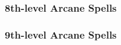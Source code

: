 \subsubsection{8th-level Arcane Spells} 
\begin{swspelllist}

    \SLspelltheftgreater*[Abjur]

    \SLimprisonment[Conj]
    \SLdimensiondoormass*
    \SLmaze*

    \SLreadmindmass[Div]
    \SLmomentofpresciencegreater*

    \SLdiscordantsong[Ench]
    \SLfeeblemind
    \SLheroismgreater
    \SLholdmonstermass
    \SLphantasmalkillermass
    \SLpowerwordconfuse
    \SLcharmmonstermass*

    \SLmissilestormgreater[Evoc]

    \SLphantasmalkillermass[Illus]

    \SLenervationgreater[Necro]
    \SLinflictcriticalwoundsmass
    \SLcurseofthewaywardmind*

    \SLhastemass[Trans]
    \SLimprisonment
    \SLironbody
    \SLtemporalstasis
    \SLreversegravity*
\end{swspelllist}

\subsubsection{9th-level Arcane Spells} 
\begin{swspelllist}

    \SLdisjoinmagic[Abjur]
    \SLenergyconversion

    \SLshadowpuppet
    \SLsummonmonsterix
    \SLetherealness*

    \SLforesightgreater[Div]
    \SLrevelation
    \SLprecognitiongreater*

    \SLdeepslumber[Ench]
    \SLirresistibledance
    \SLsuggestionmass*

    \SLenergyconversion[Evoc]
    \SLmeteorswarm

    \SLshadowpuppet[Illus]
    \SLfalsereality*

    \SLassimilate[Necro]
    \SLcripple
    \SLhorridwilting
    \SLpowerwordblind
    \SLwailofthebanshee*

    \SLassimilate[Trans]
    \SLtransmuteanyobject
    \SLtimestop*

    \SLprismaticstorm[Univ]
\end{swspelllist}


